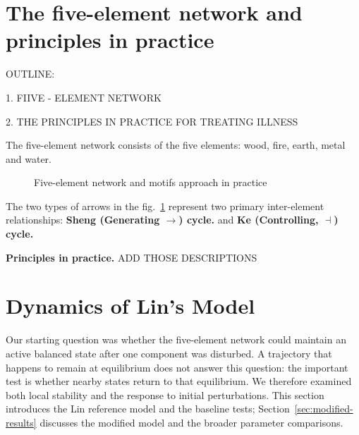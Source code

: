 \documentclass{article}
\begin{document}
\section{The five-element network and principles in practice}

OUTLINE:

1. FIIVE - ELEMENT NETWORK

2. THE PRINCIPLES IN PRACTICE FOR TREATING ILLNESS

The five-element network consists of the five elements: wood, fire, earth, metal and water. 
\begin{figure}[!htb]
\centering
{}

\caption{Five-element network  and motifs approach in practice}
\label{F:WuXing}
\end{figure}
The two types of arrows in the fig.~\ref{F:WuXing} represent two primary inter-element relationships: \textbf{Sheng (Generating $\to $) cycle.} and \textbf{Ke (Controlling, $\dashv$) cycle.}

{\bf Principles in practice.}
ADD THOSE DESCRIPTIONS

\FloatBarrier
\section{Dynamics of Lin's Model}
\label{sec:lin-results}

Our starting question was whether the five-element network could maintain
an active balanced state after one component was disturbed. A trajectory
that happens to remain at equilibrium does not answer this question: the
important test is whether nearby states return to that equilibrium. We
therefore examined both local stability and the response to initial
perturbations. This section introduces the Lin reference model and the
baseline tests; Section~\ref{sec:modified-results} discusses the modified
model and the broader parameter comparisons.
\end{document}
